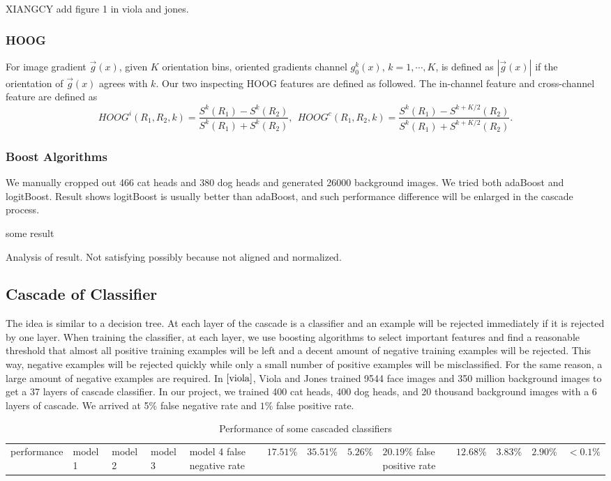 \documentclass[12pt]{article}
\begin{document}
XIANGCY add figure 1 in viola and jones.

\subsubsection{HOOG}
For image gradient $\vec{g}(x)$, given $K$ orientation bins, oriented gradients channel $g^k_0(x)$, $k = 1, \cdots, K$, is defined as $|\vec{g}(x)|$ if the orientation of $\vec{g}(x)$ agrees with $k$. Our two inspecting HOOG features are defined as followed. The in-channel feature and cross-channel feature are defined as 
\[HOOG^i(R_1,R_2, k) = \frac{S^k(R_1) - S^k(R_2)}{S^k(R_1) + S^k(R_2)}, ~~HOOG^c(R_1,R_2, k) = \frac{S^k(R_1) - S^{k+K/2}(R_2)}{S^k(R_1) + S^{k+K/2}(R_2)}.\]
\subsubsection{Boost Algorithms}
We manually cropped out 466 cat heads and 380 dog heads and generated 26000 background images. We tried both adaBoost and logitBoost. Result shows logitBoost is usually better than adaBoost, and such performance difference will be enlarged in the cascade process.

some result

Analysis of result. Not satisfying possibly because not aligned and normalized.
\subsection{Cascade of Classifier}
The idea is similar to a decision tree. At each layer of the cascade is a classifier and an example will be rejected immediately if it is rejected by one layer. When training the classifier, at each layer, we use boosting algorithms to select important features and find a reasonable threshold that almost all positive training examples will be left and a decent amount of negative training examples will be rejected. This way, negative examples will be rejected quickly while only a small number of positive examples will be misclassified. For the same reason, a large amount of negative examples are required. In $\cite{viola}$, Viola and Jones trained 9544 face images and 350 million background images to get a 37 layers of cascade classifier. In our project, we trained 400 cat heads, 400 dog heads, and 20 thousand background images with a 6 layers of cascade. We arrived at 5$\%$ false negative rate and $1\%$ false positive rate.   


\begin{table}[h]
\caption{Performance of some cascaded classifiers}
\centering
\begin{tabular}{| p{8cm}| l | l | l | l |}
\hline
performance & model 1 & model 2 & model 3 & model 4 
\hline
false negative rate & $17.51\%$ & $35.51\%$& $5.26\%$ & $20.19\%$
\hline
false positive rate & $12.68\%$ & $3.83\%$& $2.90\%$ & $<0.1\%$
\end{tabular}
\end{table}\\
\end{document}
